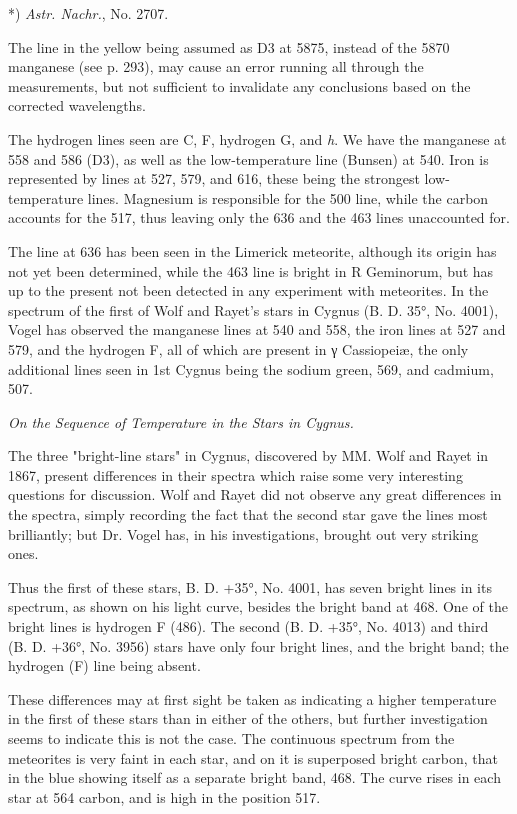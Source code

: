 \documentclass[a4paper, 12pt, oneside, polutonikogreek, english]{article}
\begin{document}
*) \emph{Astr. Nachr.}, No. 2707.

The line in the yellow being assumed as D3 at 5875, instead of the 5870 manganese (see p. 293), may cause an error running all through the measurements, but not sufficient to invalidate any conclusions based on the corrected wavelengths.

The hydrogen lines seen are C, F, hydrogen G, and \emph{h}. We have the manganese at 558 and 586 (D3), as well as the low-temperature line (Bunsen) at 540. Iron is represented by lines at 527, 579, and 616, these being the strongest low-temperature lines. Magnesium is responsible for the 500 line, while the carbon accounts for the 517, thus leaving only the 636 and the 463 lines unaccounted for.

The line at 636 has been seen in the Limerick meteorite, although its origin has not yet been determined, while the 463 line is bright in R Geminorum, but has up to the present not been detected in any experiment with meteorites. In the spectrum of the first of Wolf and Rayet's stars in Cygnus (B. D. 35°, No. 4001), Vogel has observed the manganese lines at 540 and 558, the iron lines at 527 and 579, and the hydrogen F, all of which are present in γ Cassiopeiæ, the only additional lines seen in 1st Cygnus being the sodium green, 569, and cadmium, 507.

\emph{On the Sequence of Temperature in the Stars in Cygnus.}

The three "bright-line stars" in Cygnus, discovered by MM. Wolf and Rayet in 1867, present differences in their spectra which raise some very interesting questions for discussion. Wolf and Rayet did not observe any great differences in the spectra, simply recording the fact that the second star gave the lines most brilliantly; but Dr. Vogel has, in his investigations, brought out very striking ones.

Thus the first of these stars, B. D. +35°, No. 4001, has seven bright lines in its spectrum, as shown on his light curve, besides the bright band at 468. One of the bright lines is hydrogen F (486). The second (B. D. +35°, No. 4013) and third (B. D. +36°, No. 3956) stars have only four bright lines, and the bright band; the hydrogen (F) line being absent.

These differences may at first sight be taken as indicating a higher temperature in the first of these stars than in either of the others, but further investigation seems to indicate this is not the case. The continuous spectrum from the meteorites is very faint in each star, and on it is superposed bright carbon, that in the blue showing itself as a separate bright band, 468. The curve rises in each star at 564 carbon, and is high in the position 517.
\end{document}
